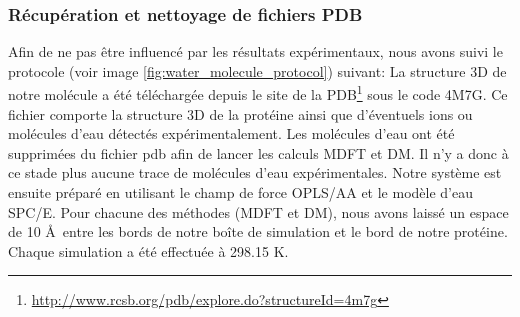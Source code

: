 \subsubsection{Récupération et nettoyage de fichiers PDB}
Afin de ne pas être influencé par les résultats expérimentaux, nous avons suivi le protocole (voir image \ref{fig:water_molecule_protocol}) suivant: La structure 3D de notre molécule a été téléchargée depuis le site de la PDB\footnote{\url{http://www.rcsb.org/pdb/explore.do?structureId=4m7g}} sous le code 4M7G. Ce fichier comporte la structure 3D de la protéine ainsi que d'éventuels ions ou molécules d'eau détectés expérimentalement. Les molécules d'eau ont été supprimées du fichier pdb afin de lancer les calculs MDFT et DM. Il n'y a donc à ce stade plus aucune trace de molécules d'eau expérimentales. Notre système est ensuite préparé en utilisant le champ de force OPLS/AA\cite{jorgensen_opls_1988} et le modèle d'eau SPC/E\cite{berendsen_missing_1987}. Pour chacune des méthodes (MDFT et DM), nous avons laissé un espace de 10 \AA\ entre les bords de notre boîte de simulation et le bord de notre protéine. Chaque simulation a été effectuée à 298.15 K.



